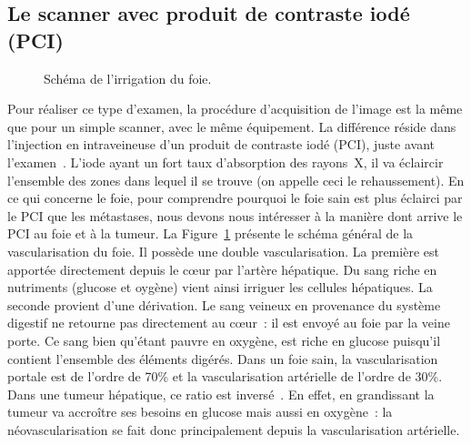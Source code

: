 \documentclass[main.tex]{subfiles}
\begin{document}
\subsection{Le scanner avec produit de contraste iodé (PCI)}
\begin{figure}[h]
\centering
\scalebox{.7}{}
\caption{\label{fig:schema_irrig_foie} Schéma de l'irrigation du foie.}
\vspace{-3mm}
\end{figure}
Pour réaliser ce type d'examen, la procédure d'acquisition de l'image est la même que pour un simple scanner, avec le même équipement. La différence réside dans l'injection en intraveineuse d'un produit de contraste iodé (PCI), juste avant l'examen~\cite{rengo2011optimal}. 
L'iode ayant un fort taux d'absorption des rayons~X, il va éclaircir l'ensemble des zones dans lequel il se trouve (on appelle ceci le rehaussement). 
En ce qui concerne le foie, pour comprendre pourquoi le foie sain est plus éclairci par le PCI que les métastases, nous devons nous intéresser à la manière dont arrive le PCI au foie et à la tumeur. 
La Figure~\ref{fig:schema_irrig_foie} présente le schéma général de la vascularisation du foie. 
Il possède une double vascularisation. La première est apportée directement depuis le c{\oe}ur par l'artère hépatique. Du sang riche en nutriments (glucose et oygène) vient ainsi irriguer les cellules hépatiques. La seconde provient d'une dérivation. 
Le sang veineux en provenance du système digestif ne retourne pas directement au c{\oe}ur~: il est envoyé au foie par la veine porte. Ce sang bien qu'étant pauvre en oxygène, est riche en glucose puisqu'il contient l'ensemble des éléments digérés. Dans un foie sain, la vascularisation portale est de l'ordre de 70\% et la vascularisation artérielle de l'ordre de 30\%. Dans une tumeur hépatique, ce ratio est inversé~\cite{li2011assessment}. 
En effet, en grandissant la tumeur va accroître ses besoins en glucose mais aussi en oxygène~: la néovascularisation se fait donc principalement depuis la vascularisation artérielle. 
\end{document}
